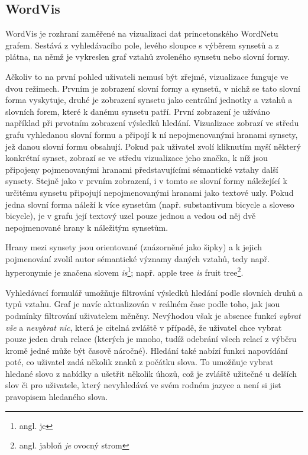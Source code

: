 \documentclass[a4paper, 11pt, oneside]{book}
\newcommand\ex{\textsf}
\begin{document}
				\subsection{WordVis}
				\label{vis:wordvis}

					WordVis je rozhraní zaměřené na vizualizaci dat princetonského WordNetu grafem. Sestává z vyhledávacího pole, levého sloupce s výběrem synsetů a z plátna, na němž je vykreslen graf vztahů zvoleného synsetu nebo slovní formy. 

					Ačkoliv to na první pohled uživateli nemusí být zřejmé, vizualizace funguje ve dvou režimech. Prvním je zobrazení slovní formy a synsetů, v nichž se tato slovní forma vyskytuje, druhé je zobrazení synsetu jako centrální jednotky a vztahů a slovních forem, které k danému synsetu patří. První zobrazení je užíváno například při prvotním zobrazení výsledků hledání. Vizualizace zobrazí ve středu grafu vyhledanou slovní formu a připojí k ní nepojmenovanými hranami synsety, jež danou slovní formu obsahují. Pokud pak uživatel zvolí kliknutím myší některý konkrétní synset, zobrazí se ve středu vizualizace jeho značka, k níž jsou připojeny pojmenovanými hranami představujícími sémantické vztahy další synsety. Stejně jako v prvním zobrazení, i v tomto se slovní formy náležející k určitému synsetu připojují nepojmenovanými hranami jako textové uzly. Pokud jedna slovní forma náleží k více synsetům (např. substantivum \ex{bicycle} a sloveso \ex{bicycle}), je v grafu její textový uzel pouze jednou a vedou od něj dvě nepojmenované hrany k náležitým synsetům. 

					Hrany mezi synsety jsou orientované (znázorněné jako šipky) a k jejich pojmenování zvolil autor sémantické významy daných vztahů, tedy např. hyperonymie je značena slovem \textit{is}\footnote{angl. je}; např. \ex{apple tree \textit{is} fruit tree}\footnote{angl. \ex{jabloň \textit{je} ovocný strom}}.

					Vyhledávací formulář umožňuje filtrování výsledků hledání podle slovních druhů a typů vztahu. Graf je navíc aktualizován v reálném čase podle toho, jak jsou podmínky filtrování uživatelem měněny. Nevýhodou však je absence funkcí \textit{vybrat vše} a \textit{nevybrat nic}, která je citelná zvláště v případě, že uživatel chce vybrat pouze jeden druh relace (kterých je mnoho, tudíž odebrání všech relací z výběru kromě jedné může být časově náročné). Hledání také nabízí funkci napovídání poté, co uživatel zadá několik znaků z počátku slova. To umožňuje vybrat hledané slovo z nabídky a ušetřit několik úhozů, což je zvláště užitečné u delších slov či pro uživatele, který nevyhledává ve svém rodném jazyce a není si jist pravopisem hledaného slova.
\end{document}
